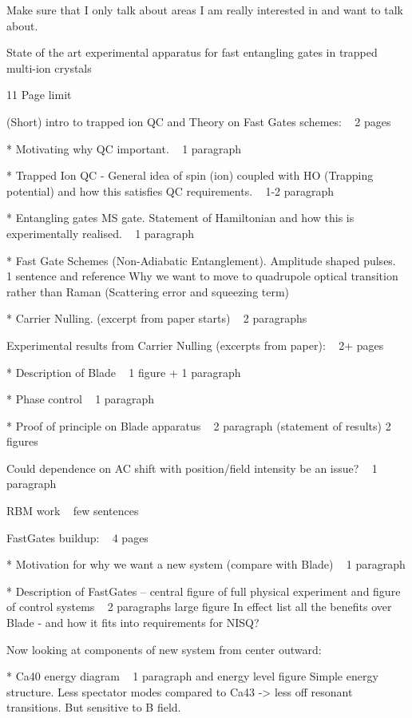 

Make sure that I only talk about areas I am really interested in and want to talk about. 


State of the art experimental apparatus for fast entangling gates in trapped multi-ion crystals

11 Page limit

(Short) intro to trapped ion QC and Theory on Fast Gates schemes: ~ 2 pages

    * Motivating why QC important. ~ 1 paragraph

    * Trapped Ion QC - General idea of spin (ion) coupled with HO (Trapping potential) and how this satisfies QC requirements. ~ 1-2 paragraph

    * Entangling gates MS gate. Statement of Hamiltonian and how this is experimentally realised. ~ 1 paragraph

    * Fast Gate Schemes (Non-Adiabatic Entanglement). Amplitude shaped pulses. ~ 1 sentence and reference
        Why we want to move to quadrupole optical transition rather than Raman (Scattering error and squeezing term)

    * Carrier Nulling. (excerpt from paper starts) ~ 2 paragraphs

 

Experimental results from Carrier Nulling (excerpts from paper): ~ 2+ pages

    * Description of Blade ~ 1 figure + 1 paragraph

    * Phase control ~ 1 paragraph

    * Proof of principle on Blade apparatus ~ 2 paragraph (statement of results) 2 figures

    Could dependence on AC shift with position/field intensity be an issue? ~ 1 paragraph

    RBM work ~ few sentences

 

FastGates buildup: ~ 4 pages

    * Motivation for why we want a new system (compare with Blade) ~ 1 paragraph

    * Description of FastGates – central figure of full physical experiment and figure of control systems ~ 2 paragraphs large figure
        In effect list all the benefits over Blade - and how it fits into requirements for NISQ?

    Now looking at components of new system from center outward:

    * Ca40 energy diagram  ~ 1 paragraph and energy level figure
        Simple energy structure. Less spectator modes compared to Ca43 -> less off resonant transitions. But sensitive to B field.


